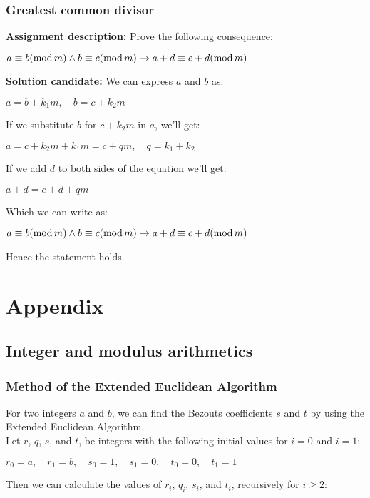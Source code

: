 \documentclass{report}
\newcommand{\cent}[1]{\begin{center}#1\end{center}}
\newcommand{\AssignmentDescription}{\textbf{Assignment description: }}
\newcommand{\Solution}{\textbf{Solution candidate: }}
\newcommand{\QED}{\boxed{}}
\newcommand{\modInline}{\text{mod\,}}
\begin{document}
	\subsection{Greatest common divisor}
	
	\AssignmentDescription
	Prove the following consequence:
	
	\cent{$a \equiv b ( \modInline m) \wedge b \equiv c (\modInline m) \to a+d \equiv c + d (\modInline m)$}
	
	\Solution
	We can express $a$ and $b$ as:
	
	\cent{$a = b+k_1m, \quad b = c + k_2m $}
	
	If we substitute $b$ for $c + k_2m $ in $a$, we'll get:
	
	\cent{$a = c+ k_2m + k_1m = c  +qm, \quad q = k_1 + k_2$}
	
	If we add $d$ to both sides of the equation we'll get:
	
	\cent{$a+d = c +d +qm$}
	
	Which we can write as:
	
	\cent{$a \equiv b ( \modInline m) \wedge b \equiv c (\modInline m) \to a+d \equiv c + d (\modInline m)$}
	
	Hence the statement holds.\\
	\QED
	\chapter{Appendix}
	\pagebreak
	
	\section{Integer and modulus arithmetics}
	\subsection{Method of the Extended Euclidean Algorithm}
	
	For two integers $a$ and $b$, we can find the Bezouts coefficients $s$ and $t$ by using the Extended Euclidean Algorithm.\\
	
	Let $r$, $q$, $s$, and $t$, be integers with the following initial values for $i=0$ and  $i=1$:
	
	
	\cent{$r_0 = a, \quad r_1 = b, \quad s_0 = 1, \quad s_1 = 0, \quad t_0 = 0, \quad t_1 = 1$}
	
	Then we can calculate the values of $r_i$, $q_i$, $s_i$, and $t_i$, recursively for $i \geq 2$:
	
\end{document}
